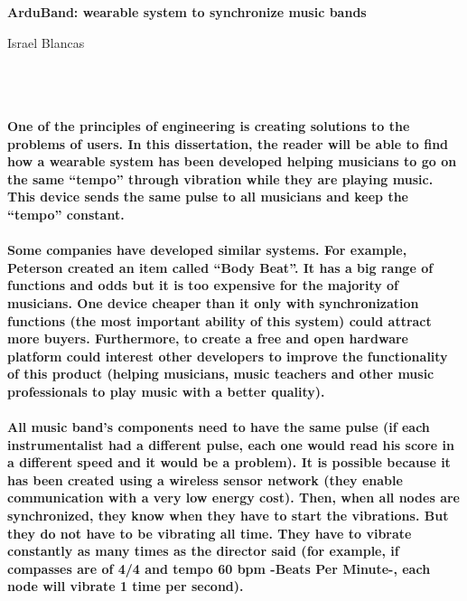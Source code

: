 \thispagestyle{empty}


\begin{center}
{\large\bfseries ArduBand: wearable system to synchronize music bands}\\
\end{center}
\begin{center}
Israel Blancas\\
\end{center}

\\

\vspace{0.7cm}
\\

\paragraph{
One of the principles of engineering is creating solutions to the problems of users. In this dissertation, the reader will be able to find how a wearable system has been developed helping musicians to go on the same “tempo” through vibration while they are playing music. This device sends the same pulse to all musicians and keep the “tempo” constant.
}

\paragraph{
Some companies have developed similar systems. For example, Peterson created an item called “Body Beat”. It has a big range of functions and odds but it is too expensive for the majority of musicians. One device cheaper than it only with synchronization functions (the most important ability of this system) could attract more buyers. Furthermore, to create a free and open hardware platform could interest other developers to improve the functionality of this product (helping musicians, music teachers and other music professionals to play music with a better quality).
}

\paragraph{
All music band’s components need to have the same pulse (if each instrumentalist had a different pulse, each one would read his score in a different speed and it would be a problem). It is possible because it has been created using a wireless sensor network (they enable communication with a very low energy cost). Then, when all nodes are synchronized, they know when they have to start the vibrations. But they do not have to be vibrating all time. They have to vibrate constantly as many times as the director said (for example, if compasses are of 4/4 and tempo 60 bpm -Beats Per Minute-, each node will vibrate 1 time per second).
}

